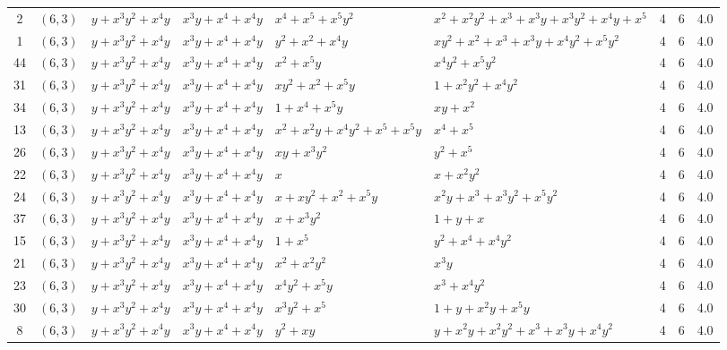 \begin{table}[t]
\begin{tabular*}{\textwidth}{@{\extracolsep{\fill}}cllllllcc}
2 & $(6,3)$ & $y{+}x^{3}y^{2}{+}x^{4}y$ & $x^{3}y{+}x^{4}{+}x^{4}y$ & $x^{4}{+}x^{5}{+}x^{5}y^{2}$ & $x^{2}{+}x^{2}y^{2}{+}x^{3}{+}x^{3}y{+}x^{3}y^{2}{+}x^{4}y{+}x^{5}$ & 4 & 6 & 4.0 \\
1 & $(6,3)$ & $y{+}x^{3}y^{2}{+}x^{4}y$ & $x^{3}y{+}x^{4}{+}x^{4}y$ & $y^{2}{+}x^{2}{+}x^{4}y$ & $xy^{2}{+}x^{2}{+}x^{3}{+}x^{3}y{+}x^{4}y^{2}{+}x^{5}y^{2}$ & 4 & 6 & 4.0 \\
44 & $(6,3)$ & $y{+}x^{3}y^{2}{+}x^{4}y$ & $x^{3}y{+}x^{4}{+}x^{4}y$ & $x^{2}{+}x^{5}y$ & $x^{4}y^{2}{+}x^{5}y^{2}$ & 4 & 6 & 4.0 \\
31 & $(6,3)$ & $y{+}x^{3}y^{2}{+}x^{4}y$ & $x^{3}y{+}x^{4}{+}x^{4}y$ & $xy^{2}{+}x^{2}{+}x^{5}y$ & $1{+}x^{2}y^{2}{+}x^{4}y^{2}$ & 4 & 6 & 4.0 \\
34 & $(6,3)$ & $y{+}x^{3}y^{2}{+}x^{4}y$ & $x^{3}y{+}x^{4}{+}x^{4}y$ & $1{+}x^{4}{+}x^{5}y$ & $xy{+}x^{2}$ & 4 & 6 & 4.0 \\
13 & $(6,3)$ & $y{+}x^{3}y^{2}{+}x^{4}y$ & $x^{3}y{+}x^{4}{+}x^{4}y$ & $x^{2}{+}x^{2}y{+}x^{4}y^{2}{+}x^{5}{+}x^{5}y$ & $x^{4}{+}x^{5}$ & 4 & 6 & 4.0 \\
26 & $(6,3)$ & $y{+}x^{3}y^{2}{+}x^{4}y$ & $x^{3}y{+}x^{4}{+}x^{4}y$ & $xy{+}x^{3}y^{2}$ & $y^{2}{+}x^{5}$ & 4 & 6 & 4.0 \\
22 & $(6,3)$ & $y{+}x^{3}y^{2}{+}x^{4}y$ & $x^{3}y{+}x^{4}{+}x^{4}y$ & $x$ & $x{+}x^{2}y^{2}$ & 4 & 6 & 4.0 \\
24 & $(6,3)$ & $y{+}x^{3}y^{2}{+}x^{4}y$ & $x^{3}y{+}x^{4}{+}x^{4}y$ & $x{+}xy^{2}{+}x^{2}{+}x^{5}y$ & $x^{2}y{+}x^{3}{+}x^{3}y^{2}{+}x^{5}y^{2}$ & 4 & 6 & 4.0 \\
37 & $(6,3)$ & $y{+}x^{3}y^{2}{+}x^{4}y$ & $x^{3}y{+}x^{4}{+}x^{4}y$ & $x{+}x^{3}y^{2}$ & $1{+}y{+}x$ & 4 & 6 & 4.0 \\
15 & $(6,3)$ & $y{+}x^{3}y^{2}{+}x^{4}y$ & $x^{3}y{+}x^{4}{+}x^{4}y$ & $1{+}x^{5}$ & $y^{2}{+}x^{4}{+}x^{4}y^{2}$ & 4 & 6 & 4.0 \\
21 & $(6,3)$ & $y{+}x^{3}y^{2}{+}x^{4}y$ & $x^{3}y{+}x^{4}{+}x^{4}y$ & $x^{2}{+}x^{2}y^{2}$ & $x^{3}y$ & 4 & 6 & 4.0 \\
23 & $(6,3)$ & $y{+}x^{3}y^{2}{+}x^{4}y$ & $x^{3}y{+}x^{4}{+}x^{4}y$ & $x^{4}y^{2}{+}x^{5}y$ & $x^{3}{+}x^{4}y^{2}$ & 4 & 6 & 4.0 \\
30 & $(6,3)$ & $y{+}x^{3}y^{2}{+}x^{4}y$ & $x^{3}y{+}x^{4}{+}x^{4}y$ & $x^{3}y^{2}{+}x^{5}$ & $1{+}y{+}x^{2}y{+}x^{5}y$ & 4 & 6 & 4.0 \\
8 & $(6,3)$ & $y{+}x^{3}y^{2}{+}x^{4}y$ & $x^{3}y{+}x^{4}{+}x^{4}y$ & $y^{2}{+}xy$ & $y{+}x^{2}y{+}x^{2}y^{2}{+}x^{3}{+}x^{3}y{+}x^{4}y^{2}$ & 4 & 6 & 4.0 \\

\end{tabular*}
\end{table}
